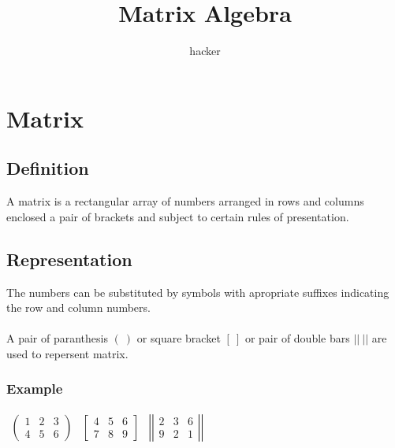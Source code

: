 \documentclass{article}
\date{}
\author{hacker}
\begin{document}
	\title{Matrix Algebra}
	\maketitle
	
	\newpage
	
	\section{Matrix}
	\subsection{Definition}
	A matrix is a rectangular array of numbers arranged in rows and columns enclosed a pair of brackets and subject to certain rules of presentation.
	
	\subsection{Representation}
	The numbers can be substituted by symbols with apropriate suffixes indicating the row and column numbers.
	\\ \\
	A pair of paranthesis  $ (~) $ or square bracket $ [~] $ or pair of double bars $ ||~|| $ are used to repersent matrix.
	
	\subsubsection{Example}
	$ \begin{array}{ccc}
		\left( \begin{array}{ccc}
			1 & 2 & 3 \\ 4 & 5 & 6
		\end{array} \right)
		&
		\left[ \begin{array}{ccc}
			4 & 5 & 6 \\ 7 & 8 & 9
		\end{array} \right]
		&
		\left|\left| \begin{array}{ccc}
			2 & 3 & 6 \\ 9 & 2 & 1
		\end{array} \right|\right|
	\end{array} $
	
\end{document}

